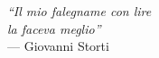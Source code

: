 \thispagestyle{empty}
{}

\vspace*{3cm}
\begin{flushright}
   \textit{``Il mio falegname con  lire\\ 
    la faceva meglio''}\\ \medskip
    --- Giovanni Storti 
\end{flushright}